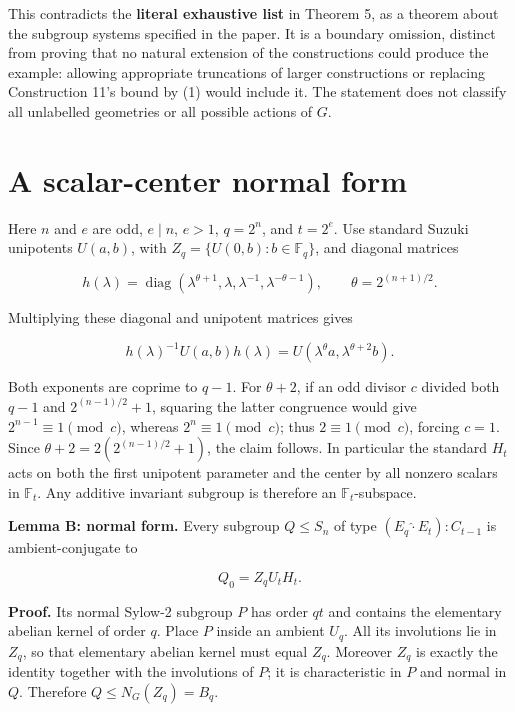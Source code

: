 \documentclass[11pt,a4paper]{article}
\begin{document}
This contradicts the \textbf{literal exhaustive list} in Theorem 5, as a
theorem about the subgroup systems specified in the paper. It is a
boundary omission, distinct from proving that no natural extension of
the constructions could produce the example: allowing appropriate
truncations of larger constructions or replacing Construction 11's bound
by (1) would include it. The statement does not classify all unlabelled
geometries or all possible actions of \(G\).

\section{A scalar-center normal
form}\label{a-scalar-center-normal-form}

Here \(n\) and \(e\) are odd, \(e\mid n\), \(e>1\), \(q=2^n\), and
\(t=2^e\). Use standard Suzuki unipotents \(U(a,b)\), with
\(Z_q=\{U(0,b):b\in\mathbb F_q\}\), and diagonal matrices

\[
 h(\lambda)=
 \operatorname{diag}(\lambda^{\theta+1},\lambda,
                     \lambda^{-1},\lambda^{-\theta-1}),
 \qquad \theta=2^{(n+1)/2}.
\]

Multiplying these diagonal and unipotent matrices gives

\[
 h(\lambda)^{-1}U(a,b)h(\lambda)
 =U(\lambda^\theta a,\lambda^{\theta+2}b).
\tag{2}
\]

Both exponents are coprime to \(q-1\). For \(\theta+2\), if an odd
divisor \(c\) divided both \(q-1\) and \(2^{(n-1)/2}+1\), squaring the
latter congruence would give \(2^{n-1}\equiv1\pmod c\), whereas
\(2^n\equiv1\pmod c\); thus \(2\equiv1\pmod c\), forcing \(c=1\). Since
\(\theta+2=2(2^{(n-1)/2}+1)\), the claim follows. In particular the
standard \(H_t\) acts on both the first unipotent parameter and the
center by all nonzero scalars in \(\mathbb F_t\). Any additive invariant
subgroup is therefore an \(\mathbb F_t\)-subspace.

\textbf{Lemma B: normal form.} Every subgroup \(Q\le S_n\) of type
\((E_q\widehat{\cdot}E_t):C_{t-1}\) is ambient-conjugate to

\[
 Q_0=Z_qU_tH_t.
\tag{3}
\]

\textbf{Proof.} Its normal Sylow-2 subgroup \(P\) has order \(qt\) and
contains the elementary abelian kernel of order \(q\). Place \(P\)
inside an ambient \(U_q\). All its involutions lie in \(Z_q\), so that
elementary abelian kernel must equal \(Z_q\). Moreover \(Z_q\) is
exactly the identity together with the involutions of \(P\); it is
characteristic in \(P\) and normal in \(Q\). Therefore
\(Q\le N_G(Z_q)=B_q\).
\end{document}
